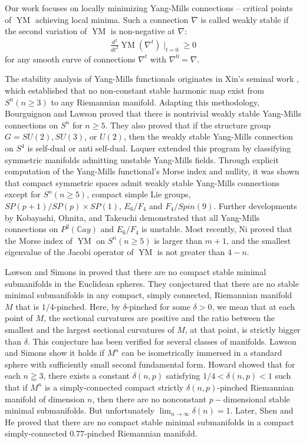 \documentclass{amsart}
\begin{document}
	Our work focuses on locally minimizing Yang-Mills connections – critical points of $\operatorname{YM}$ achieving local minima. Such a connection $\nabla$ is called weakly stable if the second variation of $\operatorname{YM}$ is non-negative at $\nabla$:
	\begin{align*}
		\frac{d^2}{dt^2}\operatorname{YM}(\nabla^t)\mid_{t=0}\ge0
	\end{align*}
	for any smooth curve of connections $\nabla^t$ with $\nabla^0=\nabla$.
	
	The stability analysis of Yang-Mills functionals originates in Xin's seminal work \cite{Xin}, which established that no non-constant stable harmonic map exist from $S^n (n\ge3)$ to any Riemannian manifold. Adapting this methodology, Bourguignon and Lawson \cite{BL} proved that there is nontrivial weakly stable Yang-Mills connections on $S^n$ for $n\ge5$. They also proved that if the structure group $G=SU(2), SU(3)$, or $U(2)$, then the weakly stable Yang-Mills connection on $S^4$ is self-dual or anti self-dual. Laquer \cite{Laquer} extended this program by classifying symmetric manifolds admitting unstable Yang-Mills fields. Through explicit computation of the Yang-Mills functional's Morse index and nullity, it was shown that compact symmetric spaces admit weakly stable Yang-Mills connections except for $S^n (n\ge5)$, compact simple Lie groups, $SP(p+1)/SP(p)\times SP(1)$, $E_6/F_4$ and $F_4/Spin(9)$. Further developments by Kobayashi, Ohnita, and Takeuchi \cite{SYM} demonstrated that all Yang-Mills connections on $P^2(\mathbb{C}ay)$ and $E_6/F_4$ is unstable. Most recently, Ni \cite{Ni} proved that the Morse index of $\operatorname{YM}$ on $S^n (n\ge5)$ is larger than $m+1$, and the smallest eigenvalue of the Jacobi operator of $\operatorname{YM}$ is not greater than $4-n$.
	
	Lawson and Simons in \cite{LS} proved that there are no compact stable minimal submanifolds in the Euclidean spheres. They conjectured that there are no stable minimal submanifolds in any compact, simply connected, Riemannian manifold $M$ that is $1/4$-pinched. Here, by $\delta$-pinched for some $\delta>0$, we mean that at each point of $M$, the sectional curvatures are positive and the ratio between the smallest and the largest sectional curvatures of $M$, at that point, is strictly bigger than $\delta$. This conjecture has been verified for several classes of manifolds. Lawson and Simons \cite{LS} show it holds if $M^n$ can be isometrically immersed in a standard sphere with sufficiently small second fundamental form.  Howard \cite{H} showed that for each $n \geqq 3$, there exists a constant $\delta(n,p)$ satisfying $1 / 4<\delta(n,p)<1$ such that if $M^n$ is a simply-connected compact strictly $\delta(n,p)$-pinched Riemannian manifold of dimension $n$, then there are no nonconstant $p-$dimensional stable minimal submanifolds. But unfortunately $\lim _{n \rightarrow \infty} \delta(n)=1$. Later, Shen and He \cite{SH} proved that there are no compact stable minimal submanifolds in a compact simply-connected $0.77$-pinched Riemannian manifold. 
	
\end{document}
